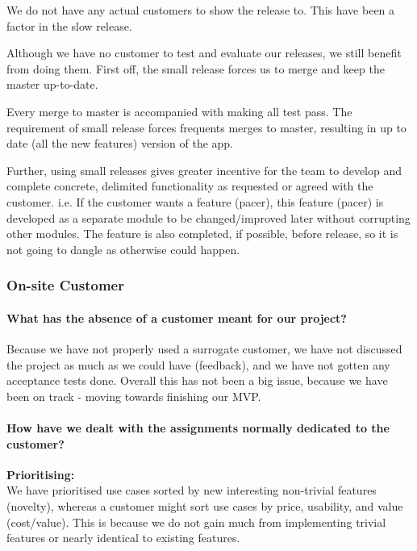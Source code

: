 We do not have any actual customers to show the release to. This have been a factor in the slow release.

Although we have no customer to test and evaluate our releases, we still benefit from doing them.
First off, the small release forces us to merge and keep the master up-to-date.

Every merge to master is accompanied with making all test pass. The requirement of small release forces frequents merges to master, resulting in up to date (all the new features) version of the app.

Further, using small releases gives greater incentive for the team to develop and complete concrete, delimited functionality %
as requested or agreed with the customer.
i.e. If the customer wants a feature (pacer), this feature (pacer) is developed as a separate module to be changed/improved later without corrupting other modules. The feature is also completed, if possible, before release, so it is not going to dangle as otherwise could happen.

\subsubsection{On-site Customer}

\paragraph{What has the absence of a customer meant for our project?}
Because we have not properly used a surrogate customer, we have not discussed the project as much as we could have (feedback), and we have not gotten any acceptance tests done. Overall this has not been a big issue, because we have been on track - moving towards finishing our MVP.

\paragraph{How have we dealt with the assignments normally dedicated to the customer?}
\textbf{Prioritising:}\\
We have prioritised use cases sorted by new interesting non-trivial features (novelty), whereas a customer might sort use cases by price, usability, and value (cost/value).
This is because we do not gain much from implementing trivial features or nearly identical to existing features.

